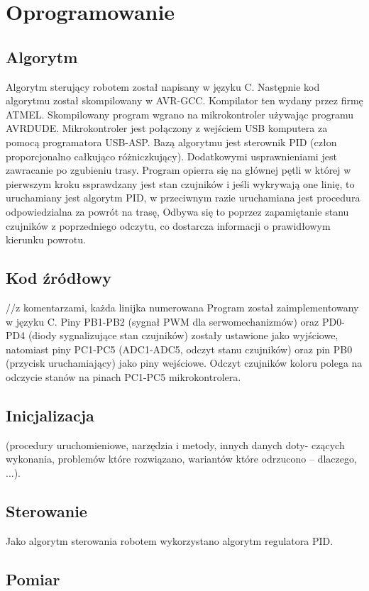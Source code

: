 \documentclass[11pt,a4paper]{article}
\begin{document}
\section{Oprogramowanie}
  \subsection{Algorytm}
  Algorytm sterujący robotem został napisany w języku C. Następnie kod algorytmu został skompilowany w AVR-GCC. Kompilator ten wydany przez firmę ATMEL. Skompilowany program wgrano na mikrokontroler używając programu AVRDUDE. Mikrokontroler jest połączony z wejściem USB komputera za pomocą programatora USB-ASP. 
  Bazą algorytmu jest sterownik PID (człon proporcjonalno całkująco różniczkujący). Dodatkowymi usprawnieniami jest zawracanie po zgubieniu trasy. Program opierra się na głównej pętli w której w pierwszym kroku ssprawdzany jest stan czujników i jeśli wykrywają one linię, to uruchamiany jest algorytm PID, w przeciwnym razie uruchamiana jest procedura odpowiedzialna za powrót na trasę, Odbywa się to poprzez zapamiętanie stanu czujników z poprzedniego odczytu, co dostarcza informacji o prawidłowym kierunku powrotu.

  \subsection{Kod źródłowy}
//z komentarzami, każda linijka numerowana
  Program został zaimplementowany w języku C. Piny PB1-PB2 (sygnał PWM dla serwomechanizmów) oraz PD0-PD4 (diody sygnalizujące stan czujników) zostały ustawione jako wyjściowe, natomiast piny PC1-PC5 (ADC1-ADC5, odczyt stanu czujników) oraz pin PB0 (przycisk uruchamiający) jako piny wejściowe. Odczyt czujników koloru polega na odczycie stanów na pinach PC1-PC5 mikrokontrolera.
  \subsection{Inicjalizacja} (procedury uruchomieniowe, narzędzia i metody, innych danych doty-
czących wykonania, problemów które rozwiązano, wariantów które odrzucono – dlaczego,
...).
  \subsection{Sterowanie}
  Jako algorytm sterowania robotem wykorzystano algorytm regulatora PID.
  \subsection{Pomiar}  
  
\end{document}
